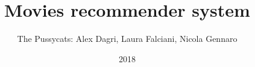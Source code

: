 \documentclass{beamer}
\title{Movies recommender system}
\author{The Pussycats: Alex Dagri, Laura Falciani, Nicola Gennaro}
\date{2018}
\begin{document}
\frame{\titlepage}
\end{document}
